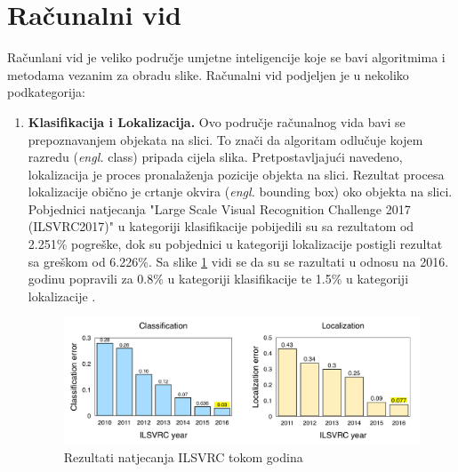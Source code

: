 \section{Računalni vid}
Računlani vid je veliko područje umjetne inteligencije koje se bavi algoritmima i metodama vezanim za obradu slike. Računalni vid podjeljen je u nekoliko podkategorija:
\begin{enumerate}
\item \textbf{Klasifikacija i Lokalizacija.} Ovo područje računalnog vida bavi se prepoznavanjem objekata na slici. To znači da algoritam odlučuje kojem razredu (\textit{engl.} class) pripada cijela slika. Pretpostavljajući navedeno, lokalizacija je proces pronalaženja pozicije objekta na slici. Rezultat procesa lokalizacije obično je crtanje okvira (\textit{engl.} bounding box) oko objekta na slici. Pobjednici natjecanja "Large Scale Visual Recognition Challenge 2017 (ILSVRC2017)" u kategoriji klasifikacije pobijedili su sa rezultatom od 2.251\% pogreške, dok su pobjednici u kategoriji lokalizacije postigli rezultat sa greškom od 6.226\%. Sa slike \ref{img:ILSVRC} vidi se da su se razultati u odnosu na 2016. godinu popravili za 0.8\% u kategoriji klasifikacije te 1.5\% u kategoriji lokalizacije .
\begin{figure}[htb]
\centering
\includegraphics[width=\linewidth]{img/ILSVRC.png}
\caption{Rezultati natjecanja ILSVRC tokom godina \citep{ILSVRC}}
\label{img:ILSVRC}
\end{figure}


\end{enumerate}
